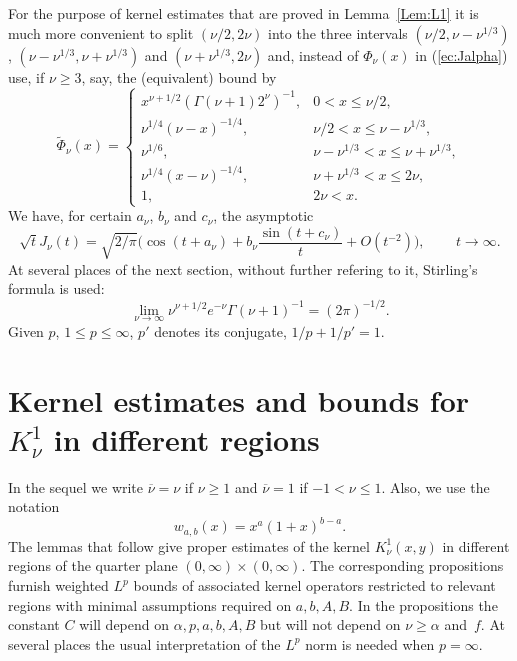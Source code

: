 \documentclass[leqno,a4paper]{amsart}
\newcommand{\overnu}{\overline{\nu}}
\begin{document}
For the purpose of kernel estimates that are proved in Lemma~\ref{Lem:L1}
it is much more convenient to split $(\nu/2,2\nu)$ into the three intervals
$(\nu/2,\nu-\nu^{1/3})$, $(\nu-\nu^{1/3},\nu+\nu^{1/3})$ and $(\nu+\nu^{1/3},
2\nu)$ and, instead of $\Phi_\nu(x)$ in (\ref{ec:Jalpha}) use, if $\nu\ge3$,
say, the (equivalent) bound by
\begin{equation*}
\widetilde{\Phi}_\nu(x) =
\begin{cases}
x^{\nu+1/2}(\Gamma(\nu+1)2^{\nu})^{-1}, & 0<x\le \nu/2,\\
\nu^{1/4}(\nu-x)^{-1/4}, & \nu/2<x\le \nu-\nu^{1/3},\\
\nu^{1/6}, & \nu-\nu^{1/3}<x\le \nu+\nu^{1/3},\\
\nu^{1/4}(x-\nu)^{-1/4}, & \nu+\nu^{1/3}<x\le 2\nu,\\
1,& 2\nu<x.
\end{cases}
\end{equation*}
We have, for certain $a_\nu$, $b_\nu$ and $c_\nu$, the asymptotic
\begin{equation}
\sqrt{t}J_\nu(t)=\sqrt{2/\pi}\bigg(\cos(t+a_\nu)+b_\nu\frac{\sin(t+c_\nu)}{t}+
O(t^{-2})\bigg),\qquad\,t\to\infty.
\label{asy2}
\end{equation}
At several places of the next section, without further refering to it, Stirling's
formula is used:
$$
\lim_{\nu\to\infty}\nu^{\nu+1/2}e^{-\nu}\Gamma(\nu+1)^{-1}=
(2\pi)^{-1/2}.
$$
Given $p$, $1\le p\le\infty$, $p'$ denotes its conjugate, $1/p+1/p'=1$.

\section{Kernel estimates and bounds for $K_\nu^1$ in different regions}

In the sequel we write $\overnu=\nu$ if $\nu\ge1$ and
$\overnu=1$ if $-1<\nu\le1$. Also, we use the notation
$$
w_{a,b}(x)=x^a(1+x)^{b-a}.
$$
The lemmas that follow give proper estimates of the kernel $K_\nu^1(x,y)$
in different regions of the quarter plane $(0,\infty)\times(0,\infty)$.
The corresponding propositions furnish weighted $L^p$ bounds of associated
kernel operators restricted to relevant regions with minimal assumptions
required on $a, b, A, B$.
In the propositions the constant $C$ will depend on $\alpha, p, a, b, A, B$
but will not depend on $\nu\ge\alpha$ and~$f$. At several places the
usual interpretation of the $L^p$ norm is needed when $p=\infty$.
\end{document}
